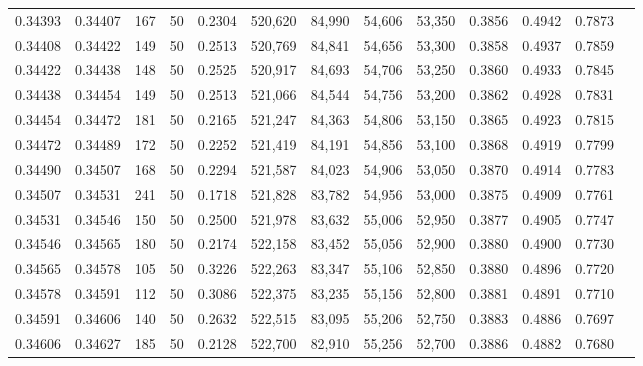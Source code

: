 \begin{tabular}{rrrrrrrrrrrrr}
0.34393 & 0.34407 &   167 &  50 &                                     0.2304 & 520,620 &  84,990 &  54,606 &  53,350 & 0.3856 & 0.4942 & 0.7873 \\
0.34408 & 0.34422 &   149 &  50 &                                     0.2513 & 520,769 &  84,841 &  54,656 &  53,300 & 0.3858 & 0.4937 & 0.7859 \\
0.34422 & 0.34438 &   148 &  50 &                                     0.2525 & 520,917 &  84,693 &  54,706 &  53,250 & 0.3860 & 0.4933 & 0.7845 \\
0.34438 & 0.34454 &   149 &  50 &                                     0.2513 & 521,066 &  84,544 &  54,756 &  53,200 & 0.3862 & 0.4928 & 0.7831 \\
0.34454 & 0.34472 &   181 &  50 &                                     0.2165 & 521,247 &  84,363 &  54,806 &  53,150 & 0.3865 & 0.4923 & 0.7815 \\
0.34472 & 0.34489 &   172 &  50 &                                     0.2252 & 521,419 &  84,191 &  54,856 &  53,100 & 0.3868 & 0.4919 & 0.7799 \\
0.34490 & 0.34507 &   168 &  50 &                                     0.2294 & 521,587 &  84,023 &  54,906 &  53,050 & 0.3870 & 0.4914 & 0.7783 \\
0.34507 & 0.34531 &   241 &  50 &                                     0.1718 & 521,828 &  83,782 &  54,956 &  53,000 & 0.3875 & 0.4909 & 0.7761 \\
0.34531 & 0.34546 &   150 &  50 &                                     0.2500 & 521,978 &  83,632 &  55,006 &  52,950 & 0.3877 & 0.4905 & 0.7747 \\
0.34546 & 0.34565 &   180 &  50 &                                     0.2174 & 522,158 &  83,452 &  55,056 &  52,900 & 0.3880 & 0.4900 & 0.7730 \\
0.34565 & 0.34578 &   105 &  50 &                                     0.3226 & 522,263 &  83,347 &  55,106 &  52,850 & 0.3880 & 0.4896 & 0.7720 \\
0.34578 & 0.34591 &   112 &  50 &                                     0.3086 & 522,375 &  83,235 &  55,156 &  52,800 & 0.3881 & 0.4891 & 0.7710 \\
0.34591 & 0.34606 &   140 &  50 &                                     0.2632 & 522,515 &  83,095 &  55,206 &  52,750 & 0.3883 & 0.4886 & 0.7697 \\
0.34606 & 0.34627 &   185 &  50 &                                     0.2128 & 522,700 &  82,910 &  55,256 &  52,700 & 0.3886 & 0.4882 & 0.7680 \\

\end{tabular}
